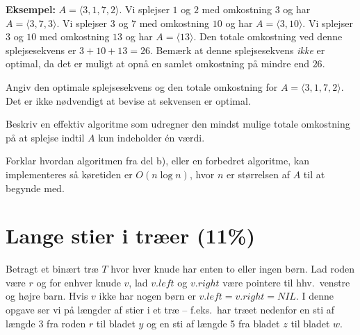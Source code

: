 \medskip

\textbf{Eksempel:}
$A=\langle 3,1,7,2\rangle$.
Vi splejser $1$ og $2$ med omkostning $3$ og har $A=\langle 3,7,3\rangle$.
Vi splejser $3$ og $7$ med omkostning $10$ og har $A=\langle 3,10\rangle$.
Vi splejser $3$ og $10$ med omkostning $13$ og har $A=\langle 13\rangle$.
Den totale omkostning ved denne splejsesekvens er $3+10+13=26$.
Bemærk at denne splejsesekvens \emph{ikke} er optimal, da det er muligt at opnå en samlet omkostning på mindre end $26$.

{
Angiv den optimale splejsesekvens og den totale omkostning for $A=\langle 3,1,7,2\rangle$. Det er ikke nødvendigt at bevise at sekvensen er optimal.
}


{
Beskriv en effektiv algoritme som udregner den mindst mulige totale omkostning på at splejse indtil $A$ kun indeholder én værdi.
}


{
Forklar hvordan algoritmen fra del b), eller en forbedret algoritme, kan implementeres så køretiden er $O(n\log n)$, hvor $n$ er størrelsen af $A$ til at begynde med.
}


\newpage
\section{Lange stier i træer (11\%)}%

Betragt et binært træ $T$ hvor hver knude har enten to eller ingen børn.
Lad roden være $r$ og for enhver knude $v$, lad $v.left$ og $v.right$ være pointere til hhv.~venstre og højre barn.
Hvis $v$ ikke har nogen børn er $v.left=v.right=NIL$.
I denne opgave ser vi på længder af stier i et træ -- f.eks.~har træet nedenfor en sti af længde 3 fra roden $r$ til bladet $y$ og en sti af længde 5 fra bladet $z$ til bladet $w$.
%
\begin{center}
\end{center}


